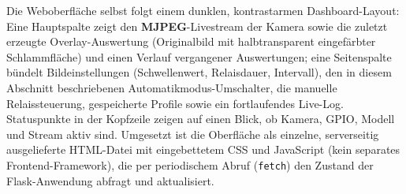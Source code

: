 Die Weboberfläche selbst folgt einem dunklen, kontrastarmen Dashboard-Layout: Eine Hauptspalte zeigt den \textbf{MJPEG}-Livestream der Kamera sowie die zuletzt erzeugte Overlay-Auswertung (Originalbild mit halbtransparent eingefärbter Schlammfläche) und einen Verlauf vergangener Auswertungen; eine Seitenspalte bündelt Bildeinstellungen (Schwellenwert, Relaisdauer, Intervall), den in diesem Abschnitt beschriebenen Automatikmodus-Umschalter, die manuelle Relaissteuerung, gespeicherte Profile sowie ein fortlaufendes Live-Log. Statuspunkte in der Kopfzeile zeigen auf einen Blick, ob Kamera, GPIO, Modell und Stream aktiv sind. Umgesetzt ist die Oberfläche als einzelne, serverseitig ausgelieferte HTML-Datei mit eingebettetem CSS und JavaScript (kein separates Frontend-Framework), die per periodischem Abruf (\texttt{fetch}) den Zustand der Flask-Anwendung abfragt und aktualisiert. 